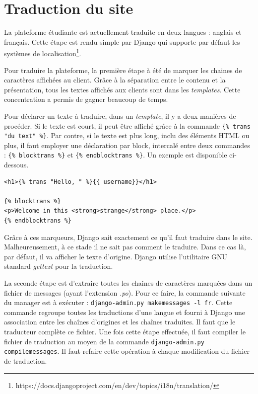 \documentclass[a4paper,12pt]{article}
\begin{document}
\section{Traduction du site}

La plateforme étudiante est actuellement traduite en deux langues : anglais et français.
Cette étape est rendu simple par Django qui supporte par défaut les systèmes
de localisation\footnote{https://docs.djangoproject.com/en/dev/topics/i18n/translation/}.

Pour traduire la plateforme, la première étape à été de marquer les chaines de
caractères affichées au client. Grâce à la séparation entre le contenu et la présentation,
tous les textes affichés aux clients sont dans les \textit{templates}. Cette concentration
a permis de gagner beaucoup de temps.

Pour déclarer un texte à traduire, dans un \textit{template}, il y a deux manières
de procéder. Si le texte est court, il peut être affiché grâce à la commande 
\texttt{\{\% trans "du text" \%\}}. Par contre, si le texte est plus long, inclu des
éléments HTML ou plus, il faut employer une déclaration par block, intercalé entre
deux commandes : \texttt{\{\% blocktrans \%\}} et \texttt{\{\% endblocktrans \%\}}.
Un exemple est disponible ci-dessous.

\begin{verbatim}
<h1>{% trans "Hello, " %}{{ username}}</h1>

{% blocktrans %}
<p>Welcome in this <strong>strange</strong> place.</p>
{% endblocktrans %}
\end{verbatim}

Grâce à ces marqueurs, Django sait exactement ce qu'il faut traduire dans le site.
Malheureusement, à ce stade il ne sait pas comment le traduire. Dans ce cas là,
par défaut, il va afficher le texte d'origine. Django utilise l'utilitaire GNU
standard \textit{gettext} pour la traduction.

La seconde étape est d'extraire toutes les chaines de caractères
marquées dans un fichier de messages (ayant l'extension \textit{.po}).
Pour ce faire, la commande suivante du
manager est à exécuter : \texttt{django-admin.py makemessages -l fr}. Cette commande
regroupe toutes les traductions d'une langue et fourni à Django une association
entre les chaînes d'origines et les chaînes traduites. Il faut que le traducteur
complète ce fichier. Une fois cette étape effectuée, il faut compiler
le fichier de traduction au moyen de la commande \texttt{django-admin.py compilemessages}.
Il faut refaire cette opération à chaque modification du fichier de traduction.
\end{document}
